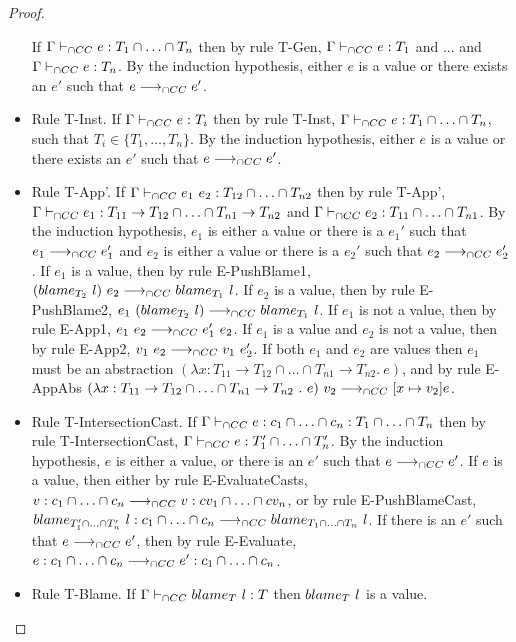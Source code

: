 \documentclass[a4paper]{article}
\begin{document}
\begin{proof}
\begin{itemize}
    If $\Gamma \vdash_{\cap CC} e : T_1 \cap \ldots \cap T_n$ then by rule T-Gen, $\Gamma \vdash_{\cap CC} e : T_1$ and ... and $\Gamma \vdash_{\cap CC} e : T_n$.
    By the induction hypothesis, either $e$ is a value or there exists an $e'$ such that $e \longrightarrow_{\cap CC} e'$.
    \item Rule T-Inst.
    If $\Gamma \vdash_{\cap CC} e : T_i$ then by rule T-Inst, $\Gamma \vdash_{\cap CC} e : T_1 \cap \ldots \cap T_n$, such that $T_i \in \{T_1, \ldots, T_n\}$.
    By the induction hypothesis, either $e$ is a value or there exists an $e'$ such that $e \longrightarrow_{\cap CC} e'$.
    \item Rule T-App'.
    If $\Gamma \vdash_{\cap CC} e_1\ e_2 : T_{12} \cap \ldots \cap T_{n2}$ then by rule T-App', $\Gamma \vdash_{\cap CC} e_1 : T_{11} \rightarrow T_{12} \cap \ldots \cap T_{n1} \rightarrow T_{n2}$ and $\Gamma \vdash_{\cap CC} e_2 : T_{11} \cap \ldots \cap T_{n1}$.
    By the induction hypothesis, $e_1$ is either a value or there is a $e_1'$ such that $e_1 \longrightarrow_{\cap CC} e_1'$ and $e_2$ is either a value or there is a $e_2'$ such that $e_2 \longrightarrow_{\cap CC} e_2'$.
    If $e_1$ is a value, then by rule E-PushBlame1, $(blame_{T_2}\ l)\ e_2 \longrightarrow_{\cap CC} blame_{T_1}\ l$.
    If $e_2$ is a value, then by rule E-PushBlame2, $e_1\ (\blame{T_2}{l}) \gios \blame{T_1}{l}$.
    If $e_1$ is not a value, then by rule E-App1, $e_1\ e_2 \longrightarrow_{\cap CC} e_1'\ e_2$.
    If $e_1$ is a value and $e_2$ is not a value, then by rule E-App2, $v_1\ e_2 \longrightarrow_{\cap CC} v_1\ e_2'$.
    If both $e_1$ and $e_2$ are values then $e_1$ must be an abstraction $(\lambda x : T_{11} \rightarrow T_{12} \cap \ldots \cap T_{n1} \rightarrow T_{n2} .\ e)$, and by rule E-AppAbs $(\lambda x : T_{11} \rightarrow T_{12} \cap \ldots \cap T_{n1} \rightarrow T_{n2}\ .\ e)\ v_2 \gios [x \mapsto v_2]e$.
    \item Rule T-IntersectionCast.
    If $\Gamma \vdash_{\cap CC} e : c_1 \cap \ldots \cap c_n : T_1 \cap \ldots \cap T_n$ then by rule T-IntersectionCast, $\Gamma \vdash_{\cap CC} e : T_1' \cap \ldots \cap T_n'$.
    By the induction hypothesis, $e$ is either a value, or there is an $e'$ such that $e \longrightarrow_{\cap CC} e'$.
    If $e$ is a value, then either by rule E-EvaluateCasts, $v : c_1 \cap \ldots \cap c_n \longrightarrow_{\cap CC} v : cv_1 \cap \ldots \cap cv_n$, or by rule E-PushBlameCast, $blame_{T_1' \cap \ldots \cap T_n'}\ l : c_1 \cap \ldots \cap c_n \longrightarrow_{\cap CC} blame_{T_1 \cap \ldots \cap T_n}\ l$.
    If there is an $e'$ such that $e \longrightarrow_{\cap CC} e'$, then by rule E-Evaluate, $e : c_1 \cap \ldots \cap c_n \longrightarrow_{\cap CC} e' : c_1 \cap \ldots \cap c_n$.
    \item Rule T-Blame.
    If $\Gamma \vdash_{\cap CC} blame_{T}\ l : T$ then $blame_{T}\ l$ is a value.
\end{itemize}
\end{proof}
\end{document}
